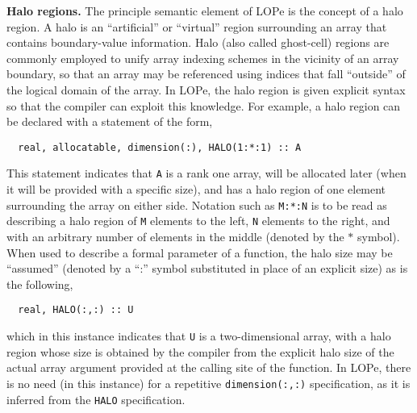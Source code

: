 \textbf{Halo regions.}
The principle semantic element of LOPe is the concept of a halo region.  A halo is an ``artificial''
or ``virtual'' region surrounding an array that contains boundary-value information.  Halo (also
called ghost-cell) regions are commonly employed to unify array indexing schemes in the vicinity of
an array boundary, so that an array may be referenced using indices that fall ``outside'' of the
logical domain of the array.  In LOPe, the halo region is given explicit syntax so that the compiler
can exploit this knowledge.  For example, a halo region can be declared with a statement of the form,
\begin{verbatim}
  real, allocatable, dimension(:), HALO(1:*:1) :: A
\end{verbatim}
This statement indicates that \texttt{A} is a rank one array, will be allocated later (when it will
be provided with a specific size), and has a halo region of one element surrounding the array on
either side.  Notation such as \texttt{M:*:N} is to be read as describing a halo region of
\texttt{M} elements to the left, \texttt{N} elements to the right, and with an arbitrary number of
elements in the middle (denoted by the $*$ symbol).  When used to describe a formal parameter of a
function, the halo size may be ``assumed'' (denoted by a ``:'' symbol substituted in place of an
explicit size) as is the following,
\begin{verbatim}
  real, HALO(:,:) :: U
\end{verbatim}
which in this instance indicates that \texttt{U} is a two-dimensional array, with a halo region
whose size is obtained by the compiler from the explicit halo size of the actual array argument
provided at the calling site of the function.  In LOPe, there is no need (in this instance) for a
repetitive \texttt{dimension(:,:)} specification, as it is inferred from the \texttt{HALO}
specification.

